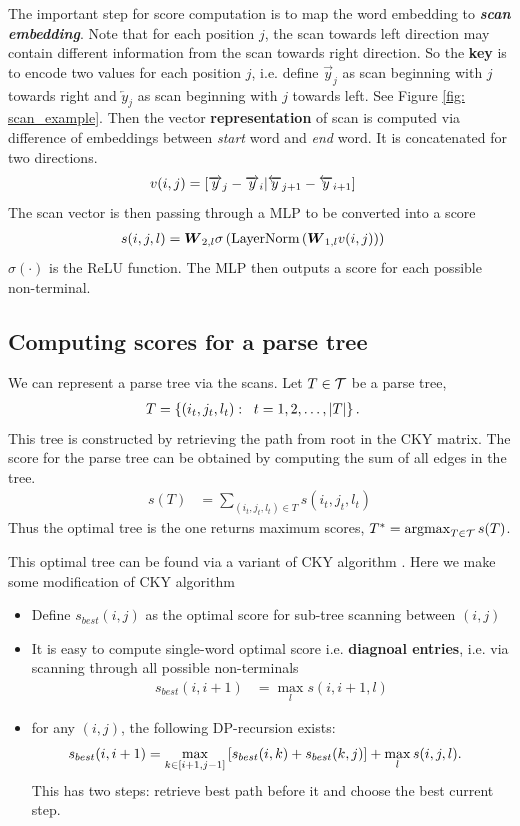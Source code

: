 \documentclass[11pt]{article}
\begin{document}
The important step for score computation is to map the word embedding to \emph{\textbf{scan embedding}}. Note that for each position $j$, the scan towards left direction may contain different information from the scan towards right direction. So the \textbf{key} is to encode two values for each position $j$, i.e. define $\overrightarrow{y}_{j}$ as scan beginning with $j$ towards right and $\overleftarrow{y}_{j}$ as scan beginning with $j$ towards left. See Figure \ref{fig: scan_example}. Then the vector \textbf{representation} of scan is computed via difference of embeddings between \emph{start} word and \emph{end} word. It is concatenated for two directions. 
\begin{align*}
v(i,j) &= \left[\overrightarrow{y}_{j} - \overrightarrow{y}_{i} | \overleftarrow{y}_{j+1} - \overleftarrow{y}_{i+1}\right]
\end{align*} The scan vector is then passing through a MLP to be converted into a score
\begin{align*}
s(i,j,l) &= \boldsymbol{W}_{2,l}\sigma\left(\text{LayerNorm}\left(\boldsymbol{W}_{1,l}v(i,j)\right)\right)
\end{align*} $\sigma(\cdot)$ is the ReLU function. The MLP then outputs a score for each possible non-terminal.

\subsection{Computing scores for a parse tree}
We can represent a parse tree via the scans. Let $T \in {\mathcal T}$ be a parse tree, 
\begin{align*}
T &= \left\{(i_{t},j_{t},l_{t}): \;\; t=1,2,\ldots, |T|\right\}.
\end{align*} This tree is constructed by retrieving the path from root in the CKY matrix. The score for the parse tree can be obtained by computing the sum of all edges in the tree. 
\begin{align*}
s(T)&= \sum_{(i_t, j_t, l_t) \in T}s(i_t, j_t, l_t)
\end{align*} Thus the optimal tree is the one returns maximum scores, $T^{*} = \operatorname{argmax}_{T\in {\mathcal T}}s(T)$. 

This optimal tree can be found via a variant of CKY algorithm \citep{gaddy2018s}. Here we make some modification of CKY algorithm
\begin{itemize}
\item Define $s_{best}(i,j)$ as the optimal score for sub-tree scanning between $(i,j)$
\item It is easy to compute single-word optimal score i.e. \textbf{diagnoal entries}, i.e. via scanning through all possible non-terminals 
\begin{align*}
s_{best}(i,i+1) &= \max_{l} s(i,i+1,l)
\end{align*}
\item for any $(i,j)$, the following DP-recursion exists:
\begin{align*}
s_{best}(i,i+1) &= \max_{k\in [i+1, j-1]}\left[s_{best}(i,k) + s_{best}(k,j)\right] + \max_{l}s(i,j,l).
\end{align*} This has two steps: retrieve best path before it and choose the best current step. 
\end{itemize}
\end{document}
